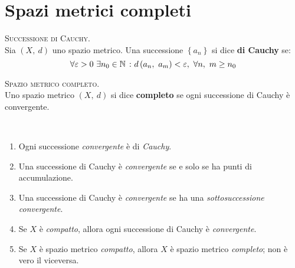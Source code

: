 \section{Spazi metrici completi}
\begin{define}\textsc{Successione di Cauchy.}\\
	Sia $\left(X,\ d\right)$ uno spazio metrico. Una successione $\left\{a_n\right\}$ si dice \textbf{di Cauchy} se:
	\begin{equation}
		\forall \epsilon>0\ \exists n_0\in\naturalset\ \colon \mvf{d}{a_n}{a_m}<\epsilon,\ \forall n,\ m\geq n_0
	\end{equation}
\vspace{-6mm}
\end{define}
\begin{define}\textsc{Spazio metrico completo.}\\
	Uno spazio metrico $\left(X,\ d\right)$ si dice \textbf{completo} se ogni successione di Cauchy è convergente.
\end{define}
\begin{observes}~{}
	\begin{enumerate}
		\item Ogni successione \textit{convergente} è di \textit{Cauchy}.
		\item Una successione di Cauchy è \textit{convergente} se e solo se ha punti di accumulazione.
		\item Una successione di Cauchy è \textit{convergente} se ha una \textit{sottosuccessione convergente}.
		\item Se $X$ è \textit{compatto}, allora ogni successione di Cauchy è \textit{convergente}.
		\item Se $X$ è spazio metrico \textit{compatto}, allora $X$ è spazio metrico \textit{completo}; non è vero il viceversa.
	\end{enumerate}
\vspace{-3mm}
\end{observes}
